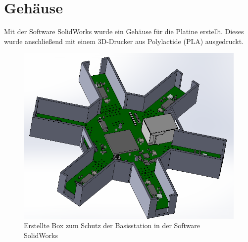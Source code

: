\section{Gehäuse}
\label{app:Gehause}
Mit der Software SolidWorks wurde ein Gehäuse für die Platine erstellt. Dieses wurde anschließend mit einem 3D-Drucker aus Polylactide (PLA) ausgedruckt.
\begin{figure}[H]
\centering
\includegraphics[width=\linewidth]{Abbildungen/Aufnahmen/Bilder/SolidWorks/BoxBildschirmSW}
\caption{Erstellte Box zum Schutz der Basisstation in der Software SolidWorks}
\label{fig:boxbildschirmsw}
\end{figure}




